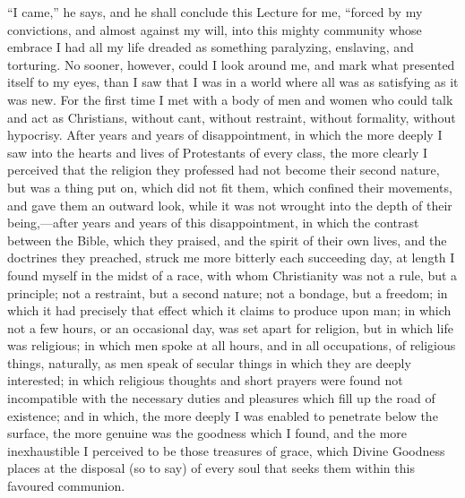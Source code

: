 ``I came,'' he says, and he shall conclude
this Lecture for me, ``forced by my convictions, and
almost against my will, into this mighty community whose
embrace I had all my life dreaded as something
paralyzing, enslaving, and torturing. No sooner, however,
could I look around me, and mark what presented itself to
my eyes, than I saw that I was in a world where all was
as satisfying as it was new. For the first time I met
with a body of men and women who could talk and act as
Christians, without cant, without restraint, without
formality, without hypocrisy. After years and years of
disappointment, in which the more deeply I saw into the
hearts and lives of Protestants of every class, the more
clearly I perceived that the religion they professed had
not become their second nature, but was a thing put on,
which did not fit them, which confined their movements,
and gave them an outward look, while it was not wrought
into the depth of their being,—after years and years of
this disappointment, in which the contrast between the
Bible, which they praised, and the spirit of their own
lives, and the doctrines they preached, struck me more
bitterly each succeeding day, at length I found myself in
the midst of a race, with whom Christianity was not a
rule, but a principle; not a restraint, but a second
nature; not a bondage, but a freedom; in which it had
precisely that effect which it claims to produce upon
man; in which not a few hours, or an occasional day, was
set apart for religion, but in which life was religious;
in which men spoke at all hours, and in all occupations,
of religious things, naturally, as men speak of secular
things in which they are deeply interested; in which
religious thoughts and short prayers were found not
incompatible with the necessary duties and pleasures
which fill up the road of existence; and in which, the
more deeply I was enabled to penetrate below the surface,
the more genuine was the goodness which I found, and the
more inexhaustible I perceived to be those treasures of
grace, which Divine Goodness places at the disposal (so
to say) of every soul that seeks them within this
favoured communion.

